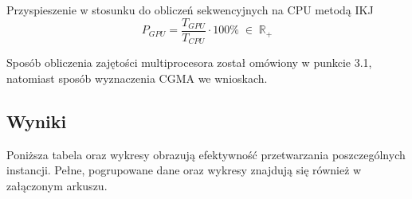 \documentclass[12pt,a4paper]{article}
\begin{document}
Przyspieszenie w stosunku do obliczeń sekwencyjnych na CPU metodą IKJ
\begin{equation}
P_{GPU} = \frac{T_{GPU}}{T_{CPU}} \cdot 100\% \; \in \; \mathbb{R}_+
\end{equation}

Sposób obliczenia zajętości multiprocesora został omówiony w punkcie 3.1, natomiast sposób wyznaczenia CGMA we wnioskach.

\subsection{Wyniki}

Poniższa tabela oraz wykresy obrazują efektywność przetwarzania poszczególnych instancji. Pełne, pogrupowane dane oraz wykresy znajdują się również w załączonym arkuszu.
\end{document}
